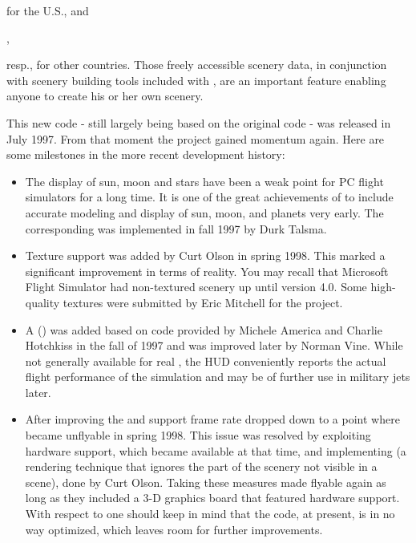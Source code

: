  \medskip

\noindent
 for the U.S., and
  \medskip

 ,
  \medskip

\noindent
 resp., for other countries. Those freely accessible scenery data, in
 conjunction with scenery building tools included with
 \FlightGear{}$\!$, are an important feature enabling anyone to
  create his or her own scenery.

This new \FlightGear{} code - still largely being based on the original 
code - was released in July 1997. From that moment the project gained momentum again.
Here are some milestones in the more recent development history:

\begin{itemize}

\item The display of sun, moon and stars have been a weak point for PC flight simulators
 for a long time. It is one of the great achievements of \FlightGear{} to include accurate modeling
 and display of sun, moon, and planets very early. The corresponding 
 was implemented in fall 1997 by Durk Talsma.

\item Texture support was added by Curt
Olson in spring 1998. This marked a
 significant improvement in terms of reality. You may recall that Microsoft Flight Simulator had
 non-textured scenery up until version 4.0. Some high-quality
 textures were submitted by Eric Mitchell
  for the \FlightGear{} project.

\item A  () was added based on code
 provided by Michele America and
 Charlie Hotch\-kiss in the fall of 1997 and was improved
 later by Norman Vine. While not generally available for real , the HUD
 conveniently reports the actual flight performance of the simulation and may be of further use
 in military jets later.

\item After improving the  and
 support  frame rate dropped down to a point where
\FlightGear{} became
 unflyable in spring 1998. This issue was resolved by exploiting hardware 
  support, which became available at that time, and implementing
   (a rendering technique that ignores the
 part of the scenery not visible in a scene), done by Curt Olson.
 Taking these measures made \FlightGear{} flyable again as long as they included a 3-D graphics board that featured
 hardware  support. With respect to  one should keep
 in mind that the code, at present, is in no way optimized, which leaves room for further
 improvements.


\end{itemize}
